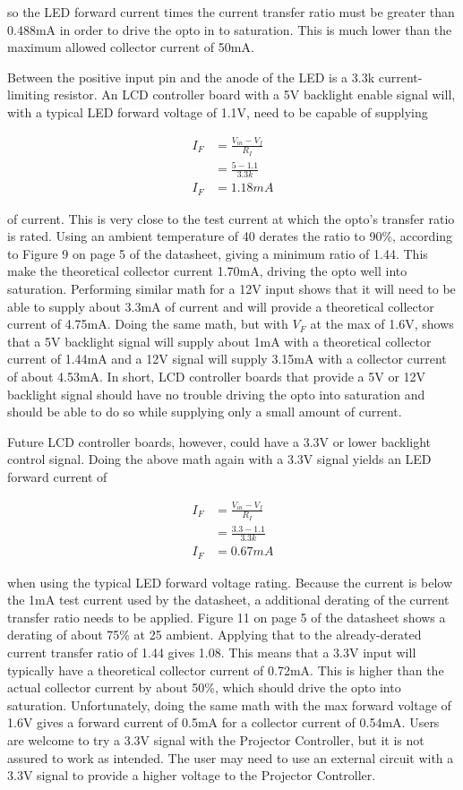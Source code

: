 \documentclass{article}
\begin{document}
so the LED forward current times the current transfer ratio must be greater than 0.488mA in order to
drive the opto in to saturation.  This is much lower than the maximum allowed collector current of
50mA.

Between the positive input pin and the anode of the LED is a 3.3k\textOmega{} current-limiting
resistor.  An LCD controller board with a 5V backlight enable signal will, with a typical LED
forward voltage of 1.1V, need to be capable of supplying

\begin{align*}
    I_F &= \frac{V_{in} - V_f}{R_I} \\
    &= \frac{5 - 1.1}{3.3k} \\
    I_F &= 1.18mA
\end{align*}

of current.  This is very close to the test current at which the opto's transfer ratio is rated.
Using an ambient temperature of 40\textcelsius{} derates the ratio to 90\%, according to Figure 9 on
page 5 of the datasheet, giving a minimum ratio of 1.44.  This make the theoretical collector
current 1.70mA, driving the opto well into saturation.  Performing similar math for a 12V input
shows that it will need to be able to supply about 3.3mA of current and will provide a theoretical
collector current of 4.75mA.  Doing the same math, but with $V_F$ at the max of 1.6V, shows that a
5V backlight signal will supply about 1mA with a theoretical collector current of 1.44mA and a 12V
signal will supply 3.15mA with a collector current of about 4.53mA.  In short, LCD controller boards
that provide a 5V or 12V backlight signal should have no trouble driving the opto into saturation
and should be able to do so while supplying only a small amount of current.

Future LCD controller boards, however, could have a 3.3V or lower backlight control signal.  Doing
the above math again with a 3.3V signal yields an LED forward current of

\begin{align*}
    I_F &= \frac{V_{in} - V_f}{R_I} \\
    &= \frac{3.3 - 1.1}{3.3k} \\
    I_F &= 0.67mA
\end{align*}

when using the typical LED forward voltage rating.  Because the current is below the 1mA test
current used by the datasheet, a additional derating of the current transfer ratio needs to be
applied.  Figure 11 on page 5 of the datasheet shows a derating of about 75\% at 25\textcelsius{}
ambient.  Applying that to the already-derated current transfer ratio of 1.44 gives 1.08.  This means
that a 3.3V input will typically have a theoretical collector current of 0.72mA.  This is higher
than the actual collector current by about 50\%, which should drive the opto into saturation.
Unfortunately, doing the same math with the max forward voltage of 1.6V gives a forward current of
0.5mA for a collector current of 0.54mA.  Users are welcome to try a 3.3V signal with the Projector
Controller, but it is not assured to work as intended.  The user may need to use an external circuit
with a 3.3V signal to provide a higher voltage to the Projector Controller.
\end{document}
